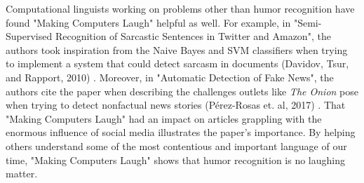 \documentclass[11pt,a4paper]{article}
\begin{document}
Computational linguists working on problems other than humor recognition have found "Making Computers Laugh" helpful as well. For example, in "Semi-Supervised Recognition of Sarcastic Sentences in Twitter and Amazon", the authors took inspiration from the Naive Bayes and SVM classifiers when trying to implement a system that could detect sarcasm in documents (Davidov, Tsur, and Rapport, 2010) \cite{davidov2010semi}. Moreover, in "Automatic Detection of Fake News", the authors cite the paper when describing the challenges outlets like \emph{The Onion} pose when trying to detect nonfactual news stories (P{\'e}rez-Rosas et. al, 2017) \cite{perez2017automatic}. That "Making Computers Laugh" had an impact on articles grappling with the enormous influence of social media illustrates the paper's importance. By helping others understand some of the most contentious and important language of our time, "Making Computers Laugh" shows that humor recognition is no laughing matter.



\end{document}
